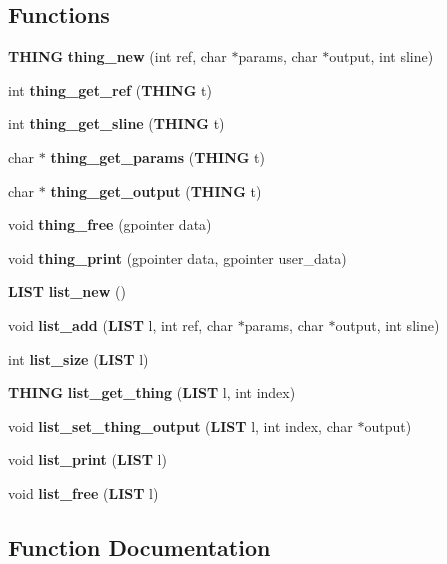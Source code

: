 \subsection*{Functions}
\begin{DoxyCompactItemize}
\item 
{\bf T\+H\+I\+NG} {\bf thing\+\_\+new} (int ref, char $\ast$params, char $\ast$output, int sline)
\item 
int {\bf thing\+\_\+get\+\_\+ref} ({\bf T\+H\+I\+NG} t)
\item 
int {\bf thing\+\_\+get\+\_\+sline} ({\bf T\+H\+I\+NG} t)
\item 
char $\ast$ {\bf thing\+\_\+get\+\_\+params} ({\bf T\+H\+I\+NG} t)
\item 
char $\ast$ {\bf thing\+\_\+get\+\_\+output} ({\bf T\+H\+I\+NG} t)
\item 
void {\bf thing\+\_\+free} (gpointer data)
\item 
void {\bf thing\+\_\+print} (gpointer data, gpointer user\+\_\+data)
\item 
{\bf L\+I\+ST} {\bf list\+\_\+new} ()
\item 
void {\bf list\+\_\+add} ({\bf L\+I\+ST} l, int ref, char $\ast$params, char $\ast$output, int sline)
\item 
int {\bf list\+\_\+size} ({\bf L\+I\+ST} l)
\item 
{\bf T\+H\+I\+NG} {\bf list\+\_\+get\+\_\+thing} ({\bf L\+I\+ST} l, int index)
\item 
void {\bf list\+\_\+set\+\_\+thing\+\_\+output} ({\bf L\+I\+ST} l, int index, char $\ast$output)
\item 
void {\bf list\+\_\+print} ({\bf L\+I\+ST} l)
\item 
void {\bf list\+\_\+free} ({\bf L\+I\+ST} l)
\end{DoxyCompactItemize}


\subsection{Function Documentation}
